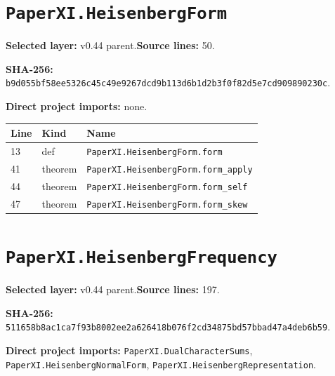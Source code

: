 \documentclass[10pt,oneside]{book}
\begin{document}
\section{\texorpdfstring{\nolinkurl{PaperXI.HeisenbergForm}}{PaperXI.HeisenbergForm}}\label{module:PaperXI.HeisenbergForm}

\textbf{Selected layer:} v0.44 parent.\quad\textbf{Source lines:} 50.\par\textbf{SHA-256:} {\scriptsize\nolinkurl{b9d055bf58ee5326c45c49e9267dcd9b113d6b1d2b3f0f82d5e7cd909890230c}}.


\textbf{Direct project imports:} none.

\begin{longtable}{@{}p{}p{}p{}@{}}\toprule Line&Kind&Name\\\midrule\endhead

13&def&\nolinkurl{PaperXI.HeisenbergForm.form}\\

41&theorem&\nolinkurl{PaperXI.HeisenbergForm.form_apply}\\

44&theorem&\nolinkurl{PaperXI.HeisenbergForm.form_self}\\

47&theorem&\nolinkurl{PaperXI.HeisenbergForm.form_skew}\\

\bottomrule\end{longtable}

\section{\texorpdfstring{\nolinkurl{PaperXI.HeisenbergFrequency}}{PaperXI.HeisenbergFrequency}}\label{module:PaperXI.HeisenbergFrequency}

\textbf{Selected layer:} v0.44 parent.\quad\textbf{Source lines:} 197.\par\textbf{SHA-256:} {\scriptsize\nolinkurl{511658b8ac1ca7f93b8002ee2a626418b076f2cd34875bd57bbad47a4deb6b59}}.


\textbf{Direct project imports:} \nolinkurl{PaperXI.DualCharacterSums}, \nolinkurl{PaperXI.HeisenbergNormalForm}, \nolinkurl{PaperXI.HeisenbergRepresentation}.
\end{document}
